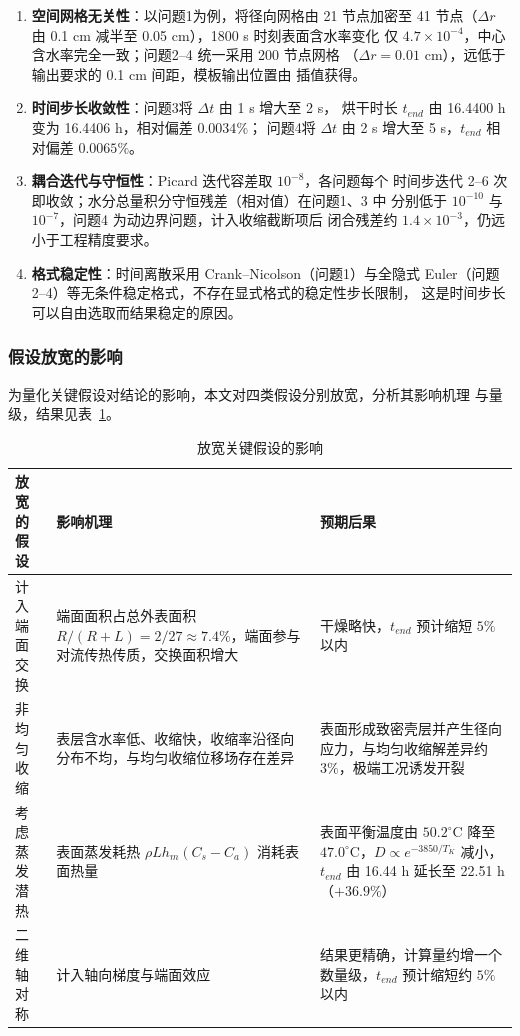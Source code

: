 \documentclass[12pt,a4paper]{article}
\begin{document}
\begin{enumerate}
\item \textbf{空间网格无关性}：以问题1为例，将径向网格由 21 节点加密至
41 节点（$\Delta r$ 由 0.1 cm 减半至 0.05 cm），1800 s 时刻表面含水率变化
仅 $4.7\times10^{-4}$，中心含水率完全一致；问题2--4 统一采用 200 节点网格
（$\Delta r=0.01$ cm），远低于输出要求的 0.1 cm 间距，模板输出位置由
插值获得。
\item \textbf{时间步长收敛性}：问题3将 $\Delta t$ 由 1 s 增大至 2 s，
烘干时长 $t_{end}$ 由 16.4400 h 变为 16.4406 h，相对偏差 $0.0034\%$；
问题4将 $\Delta t$ 由 2 s 增大至 5 s，$t_{end}$ 相对偏差 $0.0065\%$。
\item \textbf{耦合迭代与守恒性}：Picard 迭代容差取 $10^{-8}$，各问题每个
时间步迭代 2--6 次即收敛；水分总量积分守恒残差（相对值）在问题1、3 中
分别低于 $10^{-10}$ 与 $10^{-7}$，问题4 为动边界问题，计入收缩截断项后
闭合残差约 $1.4\times10^{-3}$，仍远小于工程精度要求。
\item \textbf{格式稳定性}：时间离散采用 Crank--Nicolson（问题1）与全隐式
Euler（问题2--4）等无条件稳定格式，不存在显式格式的稳定性步长限制，
这是时间步长可以自由选取而结果稳定的原因。
\end{enumerate}

\subsubsection{假设放宽的影响}
为量化关键假设对结论的影响，本文对四类假设分别放宽，分析其影响机理
与量级，结果见表~\ref{tab:assumption-relax}。

\begin{table}[H]
\centering
\caption{放宽关键假设的影响}
\label{tab:assumption-relax}
\begin{tabular}{p{3.6cm}p{6.2cm}p{4.4cm}}
\toprule
放宽的假设 & 影响机理 & 预期后果\\
\midrule
计入端面交换 & 端面面积占总外表面积 $R/(R+L)=2/27\approx7.4\%$，端面参与对流传热传质，交换面积增大 & 干燥略快，$t_{end}$ 预计缩短 $5\%$ 以内\\
非均匀收缩 & 表层含水率低、收缩快，收缩率沿径向分布不均，与均匀收缩位移场存在差异 & 表面形成致密壳层并产生径向应力，与均匀收缩解差异约 $3\%$，极端工况诱发开裂\\
考虑蒸发潜热 & 表面蒸发耗热 $\rho L h_m(C_s-C_a)$ 消耗表面热量 & 表面平衡温度由 $50.2^\circ$C 降至 $47.0^\circ$C，$D\propto e^{-3850/T_K}$ 减小，$t_{end}$ 由 16.44 h 延长至 22.51 h（$+36.9\%$）\\
二维轴对称 & 计入轴向梯度与端面效应 & 结果更精确，计算量约增一个数量级，$t_{end}$ 预计缩短约 $5\%$ 以内\\
\bottomrule
\end{tabular}
\end{table}
\end{document}
